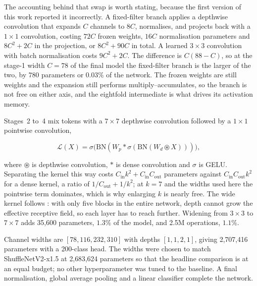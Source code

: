 The accounting behind that swap is worth stating, because the first version of
this work reported it incorrectly. A fixed-filter branch applies a depthwise
convolution that expands $C$ channels to $8C$, normalises, and projects back
with a $1\times1$ convolution, costing $72C$ frozen weights, $16C$
normalisation parameters and $8C^2 + 2C$ in the projection, or $8C^2 + 90C$ in
total. A learned $3\times3$ convolution with batch normalisation costs
$9C^2 + 2C$. The difference is $C(88 - C)$, so at the stage-1 width $C = 78$
of the final model the fixed-filter branch is the larger of the two, by $780$
parameters or $0.03\%$ of the network. The frozen weights are still weights and the
expansion still performs multiply--accumulates, so the branch is not free on
either axis, and the eightfold intermediate is what drives its activation
memory.

Stages~2 to~4 mix tokens with a $7\times7$ depthwise convolution followed by a
$1\times1$ pointwise convolution,

\begin{equation}
\label{eq:local}
\mathcal{L}(X) = \sigma\big(\mathrm{BN}(W_p \ast
  \sigma(\mathrm{BN}(W_d \circledast X)))\big),
\end{equation}

where $\circledast$ is depthwise convolution, $\ast$ is dense convolution and
$\sigma$ is GELU. Separating the kernel this way costs
$C_\text{in}k^2 + C_\text{in}C_\text{out}$ parameters against
$C_\text{in}C_\text{out}k^2$ for a dense kernel, a ratio of
$1/C_\text{out} + 1/k^2$; at $k = 7$ and the widths used here the pointwise
term dominates, which is why enlarging $k$ is nearly free. The wide kernel
follows \cite{convnext}: with only five blocks in the entire network, depth
cannot grow the effective receptive field, so each layer has to reach further.
Widening from $3\times3$ to $7\times7$ adds 35{,}600 parameters, $1.3\%$ of
the model, and 2.5M operations, $1.1\%$.

Channel widths are $[78, 116, 232, 310]$ with depths $[1, 1, 2, 1]$, giving
2{,}707{,}416 parameters with a 200-class head. The widths were chosen to
match ShuffleNetV2-x1.5 at 2{,}683{,}624 parameters so that the headline
comparison is at an equal budget; no other hyperparameter was tuned to the
baseline. A final normalisation, global average pooling and a linear
classifier complete the network.
